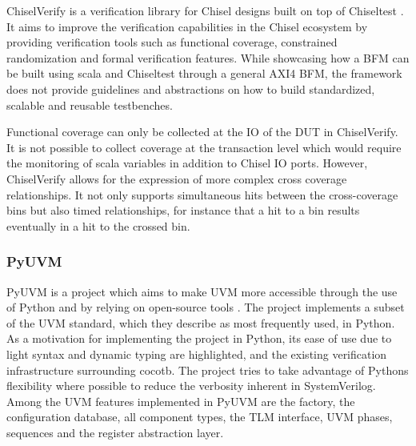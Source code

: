 \documentclass[11pt]{report}
\begin{document}
ChiselVerify is a verification library for Chisel designs built on top of Chiseltest \cite{chiselverify}. It aims to
improve the verification capabilities in the Chisel ecosystem by providing verification tools such as functional
coverage, constrained randomization and formal verification features. While showcasing how a BFM can be built using
scala and Chiseltest through a general AXI4 BFM, the framework does not provide guidelines and abstractions on how to
build standardized, scalable and reusable testbenches.

Functional coverage can only be collected at the IO of the DUT in ChiselVerify. It is not possible to collect
coverage at the transaction level which would require the monitoring of scala variables in addition to Chisel IO
ports. However, ChiselVerify allows for the expression of more complex cross coverage relationships. It not only
supports simultaneous hits between the cross-coverage bins but also timed relationships, for instance that a hit to a
bin results eventually in a hit to the crossed bin.

\begin{comment}

- functional coverage only on ports
- no sampling events for coverage
- but more complex timing relationship for cross coverage, i.e. not just simultaneous hits

- concerns itself with adding systemverilog verification capabilities
- does not provide methods to build reusable scalable testbenches

\end{comment}

\subsubsection{PyUVM} %

PyUVM is a project which aims to make UVM more accessible through the use of Python and by relying on open-source
tools \cite{pyuvm}. The project implements a subset of the UVM standard, which they describe as most frequently used,
in Python. As a motivation for implementing the project in Python, its ease of use due to light syntax and dynamic
typing are highlighted, and the existing verification infrastructure surrounding cocotb. The project tries to take
advantage of Pythons flexibility where possible to reduce the verbosity inherent in SystemVerilog. Among the UVM
features implemented in PyUVM are the factory, the configuration database, all component types, the TLM interface,
UVM phases, sequences and the register abstraction layer.
\end{document}
